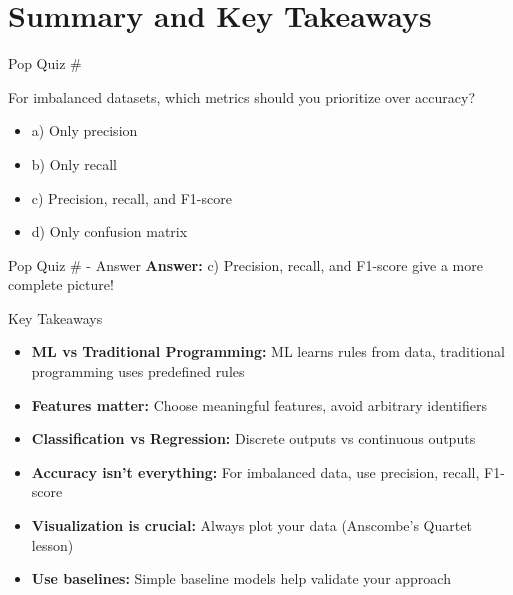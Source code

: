 \documentclass[usenames,dvipsnames]{beamer}
\begin{document}
\section{Summary and Key Takeaways}

\begin{frame}{Pop Quiz \#\thepopquiz}
\begin{popquizbox}{\thepopquiz}
For imbalanced datasets, which metrics should you prioritize over accuracy?
\begin{itemize}
	\item a) Only precision
	\item b) Only recall
	\item c) Precision, recall, and F1-score
	\item d) Only confusion matrix
\end{itemize}
\end{popquizbox}
\end{frame}

\begin{frame}{Pop Quiz \#\thepopquiz{} - Answer}
\textbf{Answer:} c) Precision, recall, and F1-score give a more complete picture!
\end{frame}

\begin{frame}{Key Takeaways}
\begin{keypointsbox}
\begin{itemize}
	\item \textbf{ML vs Traditional Programming:} ML learns rules from data, traditional programming uses predefined rules
	\item \textbf{Features matter:} Choose meaningful features, avoid arbitrary identifiers
	\item \textbf{Classification vs Regression:} Discrete outputs vs continuous outputs
	\item \textbf{Accuracy isn't everything:} For imbalanced data, use precision, recall, F1-score
	\item \textbf{Visualization is crucial:} Always plot your data (Anscombe's Quartet lesson)
	\item \textbf{Use baselines:} Simple baseline models help validate your approach
\end{itemize}
\end{keypointsbox}
\end{frame}

\end{document}
